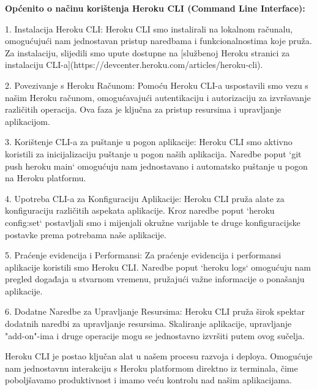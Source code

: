 \textbf{Općenito o načinu korištenja Heroku CLI (Command Line Interface):}

1. Instalacija Heroku CLI:
   Heroku CLI smo instalirali na lokalnom računalu, omogućujući nam jednostavan pristup naredbama i funkcionalnostima koje pruža. Za instalaciju, slijedili smo upute dostupne na [službenoj Heroku stranici za instalaciju CLI-a](https://devcenter.heroku.com/articles/heroku-cli).

2. Povezivanje s Heroku Računom:
    Pomoću Heroku CLI-a uspostavili smo vezu s našim Heroku računom, omogućavajući autentikaciju i autorizaciju za izvršavanje različitih operacija. Ova faza je ključna za pristup resursima i upravljanje aplikacijom.

3. Korištenje CLI-a za puštanje u pogon aplikacije:
    Heroku CLI smo aktivno koristili za inicijalizaciju puštanje u pogon naših aplikacija. Naredbe poput `git push heroku main` omogućuju nam jednostavano i automatsko puštanje u pogon na Heroku platformu.

4. Upotreba CLI-a za Konfiguraciju Aplikacije:
    Heroku CLI pruža alate za konfiguraciju različitih aspekata aplikacije. Kroz naredbe poput `heroku config:set` postavljali smo i mijenjali okružne varijable te druge konfiguracijske postavke prema potrebama naše aplikacije.

5. Praćenje evidencija i Performansi:
    Za praćenje evidencija i performansi aplikacije koristili smo Heroku CLI. Naredbe poput `heroku logs` omogućuju nam pregled događaja u stvarnom vremenu, pružajući važne informacije o ponašanju aplikacije.

6. Dodatne Naredbe za Upravljanje Resursima:
    Heroku CLI pruža širok spektar dodatnih naredbi za upravljanje resursima. Skaliranje aplikacije, upravljanje "add-on"-ima i druge operacije mogu se jednostavno izvršiti putem ovog sučelja.

Heroku CLI je postao ključan alat u našem procesu razvoja i deploya. Omogućuje nam jednostavnu interakciju s Heroku platformom direktno iz terminala, čime poboljšavamo produktivnost i imamo veću kontrolu nad našim aplikacijama. 

